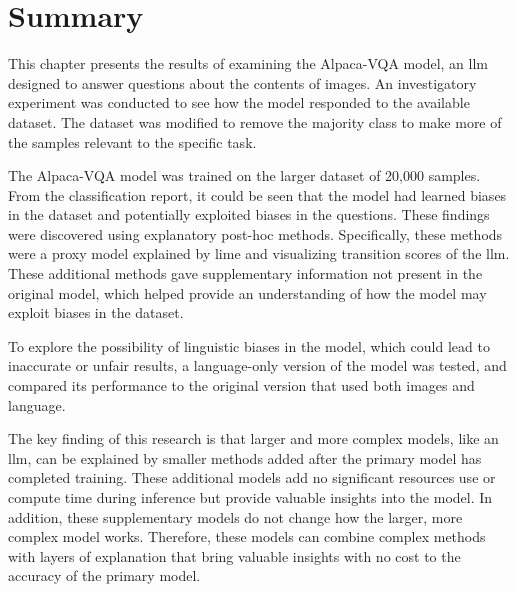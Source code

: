 \section{Summary}
\label{sec4:summary}

This chapter presents the results of examining the Alpaca-VQA model, an \gls{llm} designed to answer questions about the contents of images. An investigatory experiment was conducted to see how the model responded to the available dataset. The dataset was modified to remove the majority class to make more of the samples relevant to the specific task.

The Alpaca-VQA model was trained on the larger dataset of 20,000 samples. From the classification report, it could be seen that the model had learned biases in the dataset and potentially exploited biases in the questions. These findings were discovered using explanatory post-hoc methods. Specifically, these methods were a proxy model explained by \gls{lime} and visualizing transition scores of the \gls{llm}. These additional methods gave supplementary information not present in the original model, which helped provide an understanding of how the model may exploit biases in the dataset. 

To explore the possibility of linguistic biases in the model, which could lead to inaccurate or unfair results, a language-only version of the model was tested, and compared its performance to the original version that used both images and language.

The key finding of this research is that larger and more complex models, like an \gls{llm}, can be explained by smaller methods added after the primary model has completed training. These additional models add no significant resources use or compute time during inference but provide valuable insights into the model. In addition, these supplementary models do not change how the larger, more complex model works. Therefore, these models can combine complex methods with layers of explanation that bring valuable insights with no cost to the accuracy of the primary model. 


